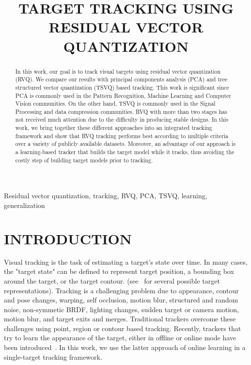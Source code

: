 \documentclass{article}
\title{TARGET TRACKING USING RESIDUAL VECTOR QUANTIZATION}
\begin{document}
\ninept
\maketitle
\begin{abstract}
In this work, our goal is to track visual targets using residual vector quantization (RVQ).  We compare our results with principal components analysis (PCA) and tree structured vector quantization (TSVQ) based tracking.  This work is significant since PCA is commonly used in the Pattern Recognition, Machine Learning and Computer Vision communities. On the other hand, TSVQ is commonly used in the Signal Processing and data compression communities. RVQ with more than two stages has not received much attention due to the difficulty in producing stable designs. In this work, we bring together these different approaches into an integrated tracking framework and show that RVQ tracking performs best according to multiple criteria over a variety of publicly available datasets. Moreover, an advantage of our approach is a learning-based tracker that builds the target model while it tracks, thus avoiding the costly step of building target models prior to tracking.
\end{abstract}
%
\begin{keywords}
Residual vector quantization, tracking, RVQ, PCA, TSVQ, learning, generalization
\end{keywords}

\section{INTRODUCTION}
Visual tracking is the task of estimating a target's state over time.  In many cases, the "target state" can be defined to represent target position, a bounding box around the target, or the target contour.  (see~\cite{2006_JNL_SURVEYtrk_Yilmaz} for several possible target representations).  Tracking is a challenging problem due to appearance, contour and pose changes, warping, self occlusion, motion blur, structured and random noise, non-symmetic BRDF, lighting changes, sudden target or camera motion, motion blur, and target exits and merges.  Traditional trackers overcome these challenges using point, region or contour based tracking.  Recently, trackers that try to learn the appearance of the target, either in offline or online mode have been introduced~\cite{2004_JNL_SVMtracking_Avidan, 2008_JNL_subspaceTRK_Ross}.  In this work, we use the latter approach of online learning in a single-target tracking framework.  
\end{document}
